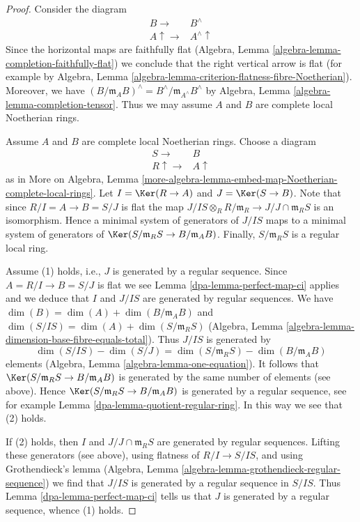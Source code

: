 \begin{proof}

Consider the diagram
$$
\begin{array}{cc}B \longrightarrow & B^\wedge \\ A \uparrow\longrightarrow & A^\wedge \uparrow\end{array}
$$
Since the horizontal maps are faithfully flat
(Algebra, Lemma \ref{algebra-lemma-completion-faithfully-flat})
we conclude that the right vertical arrow is flat
(for example by Algebra, Lemma
\ref{algebra-lemma-criterion-flatness-fibre-Noetherian}).
Moreover, we have
$(B/\mathfrak m_A B)^\wedge = B^\wedge/\mathfrak m_{A^\wedge} B^\wedge$
by Algebra, Lemma \ref{algebra-lemma-completion-tensor}.
Thus we may assume $A$ and $B$ are complete local Noetherian rings.

\medskip\noindent
Assume $A$ and $B$ are complete local Noetherian rings.
Choose a diagram
$$
\begin{array}{cc}S \longrightarrow & B \\ R \uparrow\longrightarrow & A \uparrow\end{array}
$$
as in More on Algebra, Lemma
\ref{more-algebra-lemma-embed-map-Noetherian-complete-local-rings}.
Let $I = \Ker(R \to A)$ and $J = \Ker(S \to B)$.
Note that since $R/I = A \to B = S/J$ is flat the map
$J/IS \otimes_R R/\mathfrak m_R \to J/J \cap \mathfrak m_R S$
is an isomorphism. Hence a minimal system of generators of $J/IS$
maps to a minimal system of generators of
$\Ker(S/\mathfrak m_R S \to B/\mathfrak m_A B)$.
Finally, $S/\mathfrak m_R S$ is a regular local ring.

\medskip\noindent
Assume (1) holds, i.e., $J$ is generated by a regular sequence.
Since $A = R/I \to B = S/J$ is flat we see
Lemma \ref{dpa-lemma-perfect-map-ci} applies and we deduce
that $I$ and $J/IS$ are generated by regular sequences.
We have $\dim(B) = \dim(A) + \dim(B/\mathfrak m_A B)$ and
$\dim(S/IS) = \dim(A) + \dim(S/\mathfrak m_R S)$
(Algebra, Lemma \ref{algebra-lemma-dimension-base-fibre-equals-total}).
Thus $J/IS$ is generated by
$$
\dim(S/IS) - \dim(S/J) = \dim(S/\mathfrak m_R S) - \dim(B/\mathfrak m_A B)
$$
elements (Algebra, Lemma \ref{algebra-lemma-one-equation}).
It follows that $\Ker(S/\mathfrak m_R S \to B/\mathfrak m_A B)$
is generated by the same number of elements (see above).
Hence $\Ker(S/\mathfrak m_R S \to B/\mathfrak m_A B)$
is generated by a regular sequence, see for example
Lemma \ref{dpa-lemma-quotient-regular-ring}.
In this way we see that (2) holds.

\medskip\noindent
If (2) holds, then $I$ and $J/J \cap \mathfrak m_RS$
are generated by regular sequences. Lifting these generators
(see above), using flatness of $R/I \to S/IS$,
and using Grothendieck's lemma
(Algebra, Lemma \ref{algebra-lemma-grothendieck-regular-sequence})
we find that $J/IS$ is generated by a regular sequence in $S/IS$.
Thus Lemma \ref{dpa-lemma-perfect-map-ci} tells us that $J$
is generated by a regular sequence, whence (1) holds.
\end{proof}

